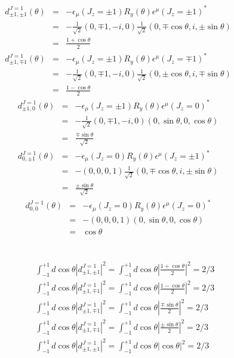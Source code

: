 \documentclass[11pt]{article}
\def\eps{\epsilon}
\def\th{\theta}
\begin{document}
\section{ }
\begin{eqnarray}
 d^{J=1}_{\pm 1,\pm 1}(\theta)&=&-\eps_\mu(J_z=\pm 1) R_y(\theta) \eps^\mu(J_z=\pm 1)^* \\ 
&=& -\frac{1}{\sqrt 2} (0,\mp 1,-i,0) \frac{1}{\sqrt 2} (0,\mp \cos\th,i,\pm \sin\th) \\ 
&=& \frac{1+\cos\th}{2}
\end{eqnarray}
\begin{eqnarray}
    d^{J=1}_{\pm 1,\mp 1}(\theta)&=&-\eps_\mu(J_z=\pm 1) R_y(\theta) \eps^\mu(J_z=\mp 1)^* \\ 
   &=& -\frac{1}{\sqrt 2} (0,\mp 1,-i,0) \frac{1}{\sqrt 2} (0,\pm \cos\th,i,\mp \sin\th) \\ 
   &=& \frac{1-\cos\th}{2}
\end{eqnarray}
\begin{eqnarray}
    d^{J=1}_{\pm 1,0}(\theta)&=&-\eps_\mu(J_z=\pm 1) R_y(\theta) \eps^\mu(J_z=0)^* \\ 
   &=& -\frac{1}{\sqrt 2} (0,\mp 1,-i,0)  (0,\sin\th,0,\cos\th) \\ 
   &=& \frac{\mp\sin\th}{\sqrt 2}
\end{eqnarray}
\begin{eqnarray}
    d^{J=1}_{0,\pm 1}(\theta)&=&-\eps_\mu(J_z=0) R_y(\theta) \eps^\mu(J_z=\pm 1)^* \\ 
   &=& - (0,0,0,1) \frac{1}{\sqrt 2}(0,\mp \cos\th,i,\pm\sin\th) \\ 
   &=& \frac{\pm\sin\th}{\sqrt 2}
\end{eqnarray}
\begin{eqnarray}
    d^{J=1}_{0,0}(\theta)&=&-\eps_\mu(J_z=0) R_y(\theta) \eps^\mu(J_z=0 )^* \\ 
   &=& - (0,0,0,1)  (0,\sin\th,0,\cos\th) \\ 
   &=& \cos\th
\end{eqnarray}

\section{ }
\begin{eqnarray}
    && \int_{-1}^{+1} d\cos\theta |d^{J=1}_{\pm 1,\pm 1}|^2 =  \int_{-1}^{+1} d\cos\theta |\frac{1+\cos\th}{2}|^2= 2/3 \\
    && \int_{-1}^{+1} d\cos\theta |d^{J=1}_{\pm 1,\mp 1}|^2 =  \int_{-1}^{+1} d\cos\theta |\frac{1-\cos\th}{2}|^2= 2/3 \\
    && \int_{-1}^{+1} d\cos\theta |d^{J=1}_{\pm 1,\mp 1}|^2 =  \int_{-1}^{+1} d\cos\theta |\frac{\mp\sin\th}{2}|^2= 2/3 \\
    && \int_{-1}^{+1} d\cos\theta |d^{J=1}_{\pm 1,\mp 1}|^2 =  \int_{-1}^{+1} d\cos\theta |\frac{\pm\sin\th}{2}|^2= 2/3 \\
    && \int_{-1}^{+1} d\cos\theta |d^{J=1}_{\pm 1,\pm 1}|^2 =  \int_{-1}^{+1} d\cos\theta |\cos\th|^2= 2/3 
\end{eqnarray}
\end{document}
